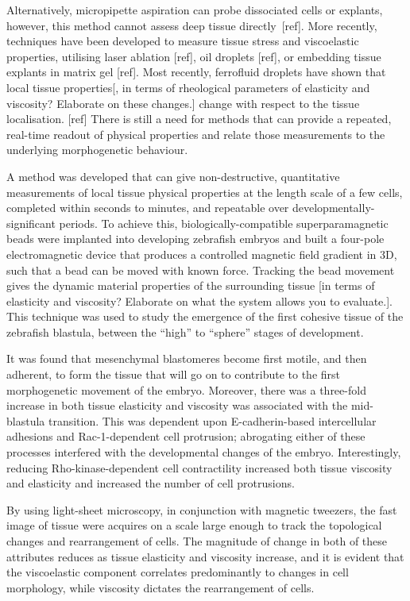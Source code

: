 Alternatively, micropipette aspiration can probe dissociated cells or explants, however, this method cannot assess deep tissue directly~[ref].
More recently, techniques have been developed to measure tissue stress and viscoelastic properties, utilising laser ablation [ref], oil droplets [ref], or embedding tissue explants in matrix gel [ref].
Most recently, ferrofluid droplets have shown that local tissue properties[, in terms of rheological parameters of elasticity and viscosity? Elaborate on these changes.] change with respect to the tissue localisation.
[ref] There is still a need for methods that can provide a repeated, real-time readout of physical properties and relate those measurements to the underlying morphogenetic behaviour.

A method was developed that can give non-destructive, quantitative measurements of local tissue physical properties at the length scale of a few cells, completed within seconds to minutes, and repeatable over developmentally-significant periods.
To achieve this, biologically-compatible superparamagnetic beads were implanted into developing \gls{zebrafish} embryos and built a four-pole electromagnetic device that produces a controlled magnetic field gradient in 3D, such that a bead can be moved with known force.
Tracking the bead movement gives the dynamic material properties of the surrounding tissue [in terms of elasticity and viscosity? Elaborate on what the system allows you to evaluate.].
This technique was used to study the emergence of the first cohesive tissue of the \gls{zebrafish} blastula, between the “high” to “sphere” stages of development.

It was found that mesenchymal blastomeres become first motile, and then adherent, to form the tissue that will go on to contribute to the first morphogenetic movement of the embryo.
Moreover, there was a three-fold increase in both tissue elasticity and viscosity was associated with the mid-blastula transition.
This was dependent upon E-cadherin-based intercellular adhesions and Rac-1-dependent cell protrusion; abrogating either of these processes interfered with the developmental changes of the embryo.
Interestingly, reducing Rho-kinase-dependent cell contractility increased both tissue viscosity and elasticity and increased the number of cell protrusions.

By using light-sheet microscopy, in conjunction with magnetic tweezers, the fast image of tissue were acquires on a scale large enough to track the topological changes and rearrangement of cells.
The magnitude of change in both of these attributes reduces as tissue elasticity and viscosity increase, and it is evident that the viscoelastic component correlates predominantly to changes in cell morphology, while viscosity dictates the rearrangement of cells.

